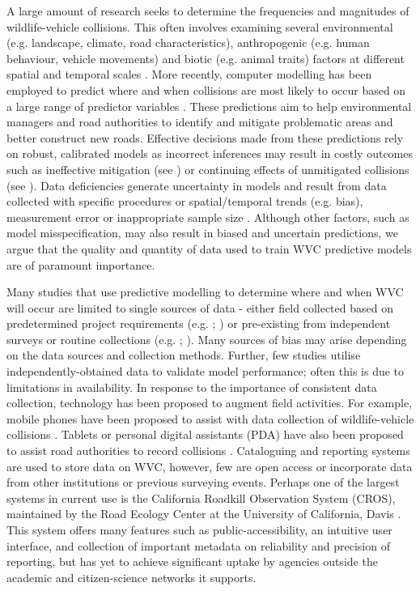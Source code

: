 A large amount of research seeks to determine the frequencies and magnitudes of wildlife-vehicle collisions. This often involves examining several environmental (e.g. landscape, climate, road characteristics), anthropogenic (e.g. human behaviour, vehicle movements) and biotic (e.g. animal traits) factors at different spatial and temporal scales \citep{litv08}. More recently, computer modelling has been employed to predict where and when collisions are most likely to occur based on a large range of predictor variables \citep{guns11}. These predictions aim to help environmental managers and road authorities to identify and mitigate problematic areas and better construct new roads. Effective decisions made from these predictions rely on robust, calibrated models as incorrect inferences may result in costly outcomes such as ineffective mitigation (see \cite{huij09}) or continuing effects of unmitigated collisions (see \cite{biss08b}). Data deficiencies generate uncertainty in models and result from data collected with specific procedures or spatial/temporal trends (e.g. bias), measurement error or inappropriate sample size \citep{bean12}. Although other factors, such as model misspecification, may also result in biased and uncertain predictions, we argue that the quality and quantity of data used to train WVC predictive models are of paramount importance.

Many studies that use predictive modelling to determine where and when WVC will occur are limited to single sources of data - either field collected based on predetermined project requirements (e.g. \cite{lang09}; \cite{roge09}) or pre-existing from independent surveys or routine collections (e.g. \cite{hoth12}; \cite{malo04}). Many sources of bias may arise depending on the data sources and collection methods. Further, few studies utilise independently-obtained data to validate model performance; often this is due to limitations in availability. In response to the importance of consistent data collection, technology has been proposed to augment field activities. For example, mobile phones have been proposed to assist with data collection of wildlife-vehicle collisions \citep{aane09,olso14}. Tablets or personal digital assistants (PDA) have also been proposed to assist road authorities to record collisions \citep{amen07}. Cataloguing and reporting systems are used to store data on WVC, however, few are open access or incorporate data from other institutions or previous surveying events. Perhaps one of the largest systems in current use is the California Roadkill Observation System (CROS), maintained by the Road Ecology Center at the University of California, Davis \citep{shil15b}. This system offers many features such as public-accessibility, an intuitive user interface, and collection of important metadata on reliability and precision of reporting, but has yet to achieve significant uptake by agencies outside the academic and citizen-science networks it supports.

